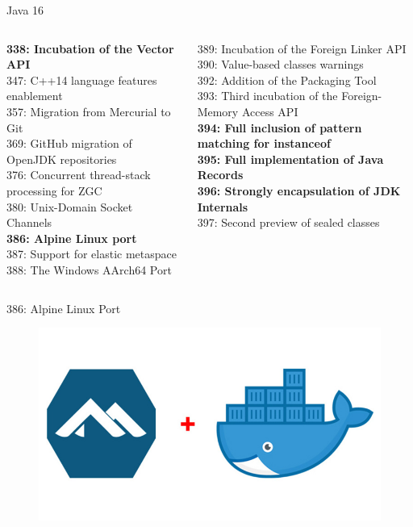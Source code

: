 \documentclass[aspectratio=169]{beamer}
\begin{document}
\begin{frame}[fragile]{Java 16}\scriptsize
    \begin{columns}[T] %
        
        \begin{column}[T]{6cm} %
            \textbf{338: Incubation of the Vector API}\\
            347: C++14 language features enablement\\
            357: Migration from Mercurial to Git\\
            369: GitHub migration of OpenJDK repositories\\
            376: Concurrent thread-stack processing for ZGC\\
            380: Unix-Domain Socket Channels\\
            \textbf{386: Alpine Linux port}\\
            387: Support for elastic metaspace\\
            388: The Windows AArch64 Port\\
        \end{column}
        \begin{column}[T]{6cm} %
                389: Incubation of the Foreign Linker API\\
                390: Value-based classes warnings\\
                392: Addition of the Packaging Tool\\
                393: Third incubation of the Foreign-Memory Access API\\
                \textbf{394: Full inclusion of pattern matching for instanceof}\\
                \textbf{395: Full implementation of Java Records}\\
                \textbf{396: Strongly encapsulation of JDK Internals}\\
                397: Second preview of sealed classes
        \end{column}
    \end{columns}
\end{frame}

\begin{frame}[fragile]{386: Alpine Linux Port}

\begin{figure}
\centering
\includegraphics[width=0.7\linewidth]{Images/alpine}
\end{figure}


\end{frame}
\end{document}
